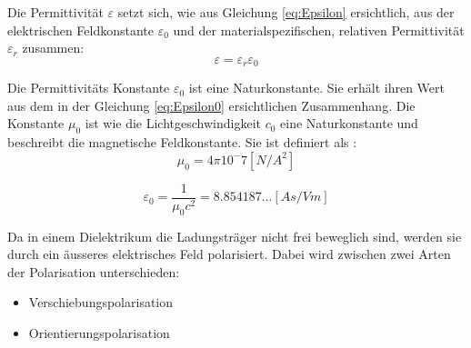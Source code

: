 Die Permittivität $\varepsilon$ setzt sich, wie aus Gleichung \ref{eq:Epsilon} ersichtlich, aus der elektrischen Feldkonstante $\varepsilon_0$ und der materialspezifischen, relativen Permittivität $\varepsilon_r$ zusammen:
\begin{equation}\label{eq:Epsilon}
\varepsilon = \varepsilon_r \varepsilon_0
\end{equation}

Die Permittivitäts Konstante $\varepsilon_{0}$ ist eine Naturkonstante. Sie erhält ihren Wert aus dem in der Gleichung \ref{eq:Epsilon0} ersichtlichen Zusammenhang. Die Konstante $\mu_{0}  $ ist wie die Lichtgeschwindigkeit $c_0$ eine Naturkonstante und beschreibt die magnetische Feldkonstante. Sie ist definiert als \cite {WikiPermitt}: 
\begin{equation}\label{mu_0}
\mu_{0}=4\pi10^-7 [N/A^{2}] 
\end{equation}

\begin{equation}\label{eq:Epsilon0}
\varepsilon_{0} = \dfrac{1}{\mu_{0}c^{2}}=8.854187...[As/Vm]
\end{equation}


Da in einem Dielektrikum die Ladungsträger nicht frei beweglich sind, werden sie durch ein äusseres elektrisches Feld polarisiert. Dabei wird zwischen zwei Arten der Polarisation unterschieden:
\begin{itemize}
\item Verschiebungspolarisation
\item Orientierungspolarisation
\end{itemize}

